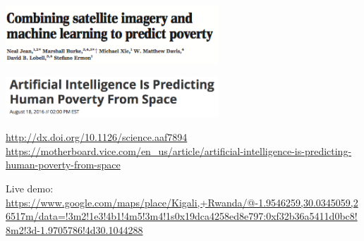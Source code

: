 \documentclass[aspectratio=169]{beamer}
\begin{document}
\begin{frame}

\begin{center}
\includegraphics[width=0.6\textwidth]{figures/jean_combining_2016_title}
\end{center}

\pause

\begin{center}
\includegraphics[width=0.6\textwidth]{figures/vice_headline.png}
\end{center}

\vfill
\url{http://dx.doi.org/10.1126/science.aaf7894}\\
\url{https://motherboard.vice.com/en_us/article/artificial-intelligence-is-predicting-human-poverty-from-space}

\end{frame}
\begin{frame}

Live demo:
\url{https://www.google.com/maps/place/Kigali,+Rwanda/@-1.9546259,30.0345059,26517m/data=!3m2!1e3!4b1!4m5!3m4!1s0x19dca4258ed8e797:0xf32b36a5411d0bc8!8m2!3d-1.9705786!4d30.1044288}

\end{frame}
\end{document}
